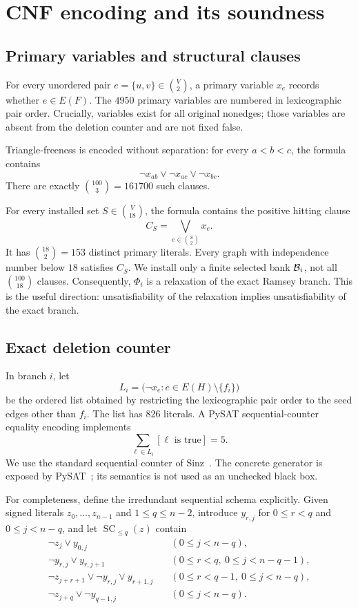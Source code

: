 \section{CNF encoding and its soundness}\label{sec:encoding}

\subsection{Primary variables and structural clauses}

For every unordered pair \(e=\{u,v\}\in\binom V2\), a primary variable
\(x_e\) records whether \(e\in E(F)\).  The \(4950\) primary variables are
numbered in lexicographic pair order.  Crucially, variables exist for all
original nonedges; those variables are absent from the deletion counter and
are not fixed false.

Triangle-freeness is encoded without separation: for every \(a<b<c\), the
formula contains
\[
  \neg x_{ab}\lor\neg x_{ac}\lor\neg x_{bc}.
\]
There are exactly \(\binom{100}{3}=161700\) such clauses.

For every installed set \(S\in\binom V{18}\), the formula contains the
positive hitting clause
\[
  C_S=\bigvee_{e\in\binom S2}x_e.                 \tag{4.1}
\]
It has \(\binom{18}{2}=153\) distinct primary literals.  Every graph with
independence number below \(18\) satisfies \(C_S\).  We install only a finite
selected bank \(\mathcal B_i\), not all \(\binom{100}{18}\) clauses.  Consequently,
\(\Phi_i\) is a relaxation of the exact Ramsey branch.  This is the useful
direction: unsatisfiability of the relaxation implies unsatisfiability of the
exact branch.

\subsection{Exact deletion counter}

In branch \(i\), let
\[
  L_i=\bigl(\neg x_e:e\in E(H)\setminus\{f_i\}\bigr)
\]
be the ordered list obtained by restricting the lexicographic pair order to
the seed edges other than \(f_i\).  The list has \(826\) literals.  A PySAT
sequential-counter equality encoding
implements
\[
  \sum_{\ell\in L_i}[\ell\text{ is true}]=5.      \tag{4.2}
\]
We use the standard sequential counter of Sinz~\cite{Sinz2005}.  The concrete
generator is exposed by PySAT~\cite{Ignatiev2018}; its semantics is not used as
an unchecked black box.

For completeness, define the irredundant sequential schema explicitly.  Given
signed literals \(z_0,\ldots,z_{n-1}\) and \(1\le q\le n-2\), introduce
\(y_{r,j}\) for \(0\le r<q\) and \(0\le j<n-q\), and let
\(\operatorname{SC}_{\le q}(z)\) contain
\begin{align*}
 \neg z_j\lor y_{0,j}\quad
   &(0\le j<n-q),\\
 \neg y_{r,j}\lor y_{r,j+1}\quad
   &(0\le r<q,\ 0\le j<n-q-1),\\
 \neg z_{j+r+1}\lor\neg y_{r,j}\lor y_{r+1,j}\quad
   &(0\le r<q-1,\ 0\le j<n-q),\\
 \neg z_{j+q}\lor\neg y_{q-1,j}\quad
   &(0\le j<n-q).
\end{align*}

